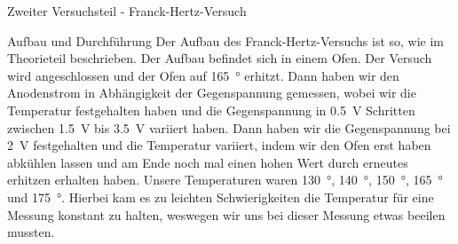 \documentclass[pdftex, a4paper,11pt, twoside, ngerman]{report}
\begin{document}
  \begin{chapter}{Zweiter Versuchsteil - Franck-Hertz-Versuch}
    \label{chp:Balmer}
 
 
    \begin{section}{Aufbau und Durchführung}
      \label{chp:Balmer:sec:Aufbau}
      Der Aufbau des Franck-Hertz-Versuchs ist so, wie im Theorieteil
      beschrieben. Der Aufbau befindet sich in einem Ofen. 
      Der Versuch wird angeschlossen und der Ofen auf \SI{165}{\degree} erhitzt.
      Dann haben wir den Anodenstrom in Abhängigkeit der Gegenspannung gemessen,
      wobei wir die Temperatur festgehalten haben und die Gegenspannung in
      \SI{0,5}{\volt} Schritten zwischen \SI{1,5}{\volt} bis \SI{3,5}{\volt}
      variiert haben. Dann haben wir die Gegenspannung bei \SI{2}{\volt}
      festgehalten und die Temperatur variiert, indem wir den Ofen erst haben
      abkühlen lassen und am Ende noch mal einen hohen Wert durch erneutes
      erhitzen erhalten haben. Unsere Temperaturen waren \SI{130}{\degree},
      \SI{140}{\degree}, \SI{150}{\degree}, \SI{165}{\degree} und
      \SI{175}{\degree}. Hierbei kam es zu leichten Schwierigkeiten die
      Temperatur für eine Messung konstant zu halten, weswegen wir uns bei
      dieser Messung etwas beeilen mussten. 
      
    \end{section}
    
    
    

\end{chapter}
\end{document}
